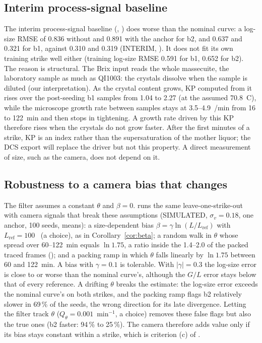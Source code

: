 \subsection{Interim process-signal baseline}\label{sec:res-process}

The interim process-signal baseline (, ) does worse than the nominal curve: a
log-size RMSE of 0.836 without and 0.891 with the anchor for b2, and 0.637 and 0.321 for b1, against 0.310 and 0.319
(INTERIM, ). It does not fit its own training strike well either (training
log-size RMSE 0.591 for b1, 0.652 for b2). The reason is structural. The Brix input reads the whole massecuite, the
laboratory sample as much as QI1003: the crystals dissolve when the sample is diluted (our interpretation). As the crystal content
grows, KP computed from it rises over the post-seeding b1 samples from 1.04 to 2.27 (at the assumed 70.8~\textdegree C),
while the microscope growth rate between samples stays at 3.5--4.9~\um/min from 16 to 122~min and then stops in
tightening. A growth rate driven by this KP therefore rises when the crystals do not grow faster. After the first
minutes of a strike, KP is an index rather than the supersaturation of the mother liquor; the DCS export will
replace the driver but not this property. A direct measurement of size, such as the camera, does not depend on it.

\subsection{Robustness to a camera bias that changes}\label{sec:res-robust}

The filter assumes a constant $\theta$ and $\beta = 0$.  runs the same leave-one-strike-out with
camera signals that break these assumptions (SIMULATED, $\sigma_v = 0.18$, one anchor, 100 seeds, means): a
size-dependent bias $\beta = \gamma \ln(L/L_\mathrm{ref})$ with $L_\mathrm{ref} = 100$~\um{} (a choice), as in
Corollary~\ref{cor:beta}; a random walk in $\theta$ whose spread over 60--122~min equals $\ln 1.75$, a ratio inside the
1.4--2.0 of the packed traced frames (); and a
packing ramp in which $\theta$ falls linearly by $\ln 1.75$ between 60 and 122~min. A bias with $\gamma = 0.1$ is
tolerable. With $|\gamma| = 0.3$ the log-size error is close to or worse than the nominal curve's, although the
$G/L$ error stays below that of every reference. A drifting $\theta$ breaks the estimate: the log-size error exceeds
the nominal curve's on both strikes, and the packing ramp flags b2 relatively slower in 69\,\% of the seeds, the wrong
direction for its late divergence. Letting the filter track $\theta$ ($Q_\theta = 0.001$~min$^{-1}$, a choice)
removes these false flags but also the true ones (b2 faster: 94\,\% to 25\,\%). The camera therefore adds value only
if its bias stays constant within a strike, which is criterion (c) of .

